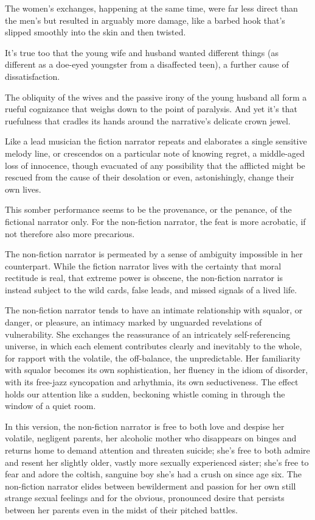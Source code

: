 \documentclass[
]{memoir}
\begin{document}
The women's exchanges, happening at the same time, were far less direct
than the men's but resulted in arguably more damage, like a barbed hook
that's slipped smoothly into the skin and then twisted.

It's true too that the young wife and husband wanted different things
(as different as a doe-eyed youngster from a disaffected teen), a
further cause of dissatisfaction.

The obliquity of the wives and the passive irony of the young husband
all form a rueful cognizance that weighs down to the point of paralysis.
And yet it's that ruefulness that cradles its hands around the
narrative's delicate crown jewel.

Like a lead musician the fiction narrator repeats and elaborates a
single sensitive melody line, or crescendos on a particular note of
knowing regret, a middle-aged loss of innocence, though evacuated of any
possibility that the afflicted might be rescued from the cause of their
desolation or even, astonishingly, change their own lives.

This somber performance seems to be the provenance, or the penance, of
the fictional narrator only. For the non-fiction narrator, the feat is
more acrobatic, if not therefore also more precarious.

The non-fiction narrator is permeated by a sense of ambiguity impossible
in her counterpart. While the fiction narrator lives with the certainty
that moral rectitude is real, that extreme power is obscene, the
non-fiction narrator is instead subject to the wild cards, false leads,
and missed signals of a lived life.

The non-fiction narrator tends to have an intimate relationship with
squalor, or danger, or pleasure, an intimacy marked by unguarded
revelations of vulnerability. She exchanges the reassurance of an
intricately self-referencing universe, in which each element contributes
clearly and inevitably to the whole, for rapport with the volatile, the
off-balance, the unpredictable. Her familiarity with squalor becomes its
own sophistication, her fluency in the idiom of disorder, with its
free-jazz syncopation and arhythmia, its own seductiveness. The effect
holds our attention like a sudden, beckoning whistle coming in through
the window of a quiet room.

In this version, the non-fiction narrator is free to both love and
despise her volatile, negligent parents, her alcoholic mother who
disappears on binges and returns home to demand attention and threaten
suicide; she's free to both admire and resent her slightly older, vastly
more sexually experienced sister; she's free to fear and adore the
coltish, sanguine boy she's had a crush on since age six. The
non-fiction narrator elides between bewilderment and passion for her own
still strange sexual feelings and for the obvious, pronounced desire
that persists between her parents even in the midst of their pitched
battles.
\end{document}
